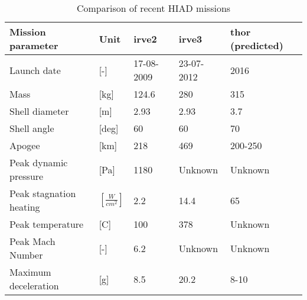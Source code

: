 \begin{table}[h!]
	\caption{Comparison of recent HIAD missions} \label{tab:hiadcomparison}%
		\begin{tabular}{|p{}|p{}|p{}|p{}|p{}|} %
			\hline

       Mission parameter   &       Unit &     \gls{irve2} \cite{Dillman2010} &     \gls{irve3} \citep{Dillman2012,Dillman2014} & \gls{thor} (predicted) \citep{Dillman2014} \\
			\hline \hline

Launch date &          [-] & 17-08-2009 & 23-07-2012 &       2016 \\
			\hline

      Mass &         [kg] &    124.6 &        280 &        315 \\
			\hline

Shell diameter &          [m] &       2.93 &       2.93 &        3.7 \\
			\hline

Shell angle &     [deg] &         60 &         60 &         70 \\
			\hline

    Apogee &         [km] &        218 &        469 &    200-250 \\
			\hline

Peak dynamic pressure &         [Pa] &       1180 &   Unknown         &   Unknown         \\
			\hline

Peak stagnation heating &     $ [\frac{W}{cm^{2}}]$ &        2.2 &       14.4 &         65 \\
			\hline

Peak temperature &          [C] &        100 &        378 &      Unknown      \\
			\hline

Peak Mach Number &          [-] &        6.2 &  Unknown          &   Unknown         \\
			\hline

Maximum deceleration &          [g] &        8.5 &       20.2 &       8-10 \\
			\hline

		\end{tabular}
    
\end{table}

